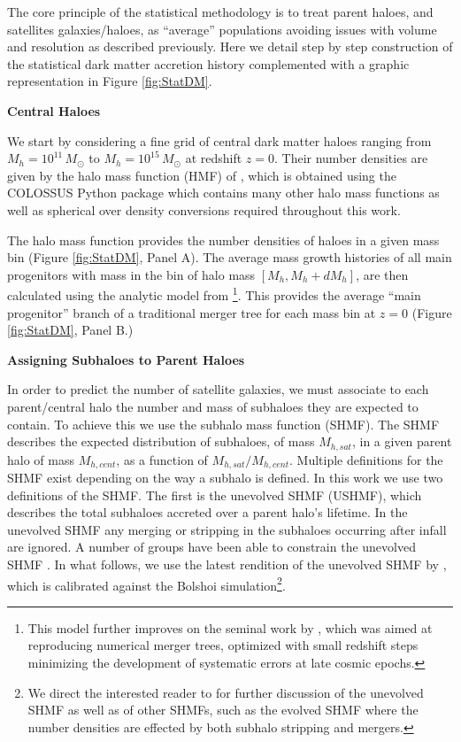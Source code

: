 The core principle of the statistical methodology is to treat parent haloes, and satellites galaxies/haloes, as ``average'' populations avoiding issues with volume and resolution as described previously. Here  we detail step by step construction of the statistical dark matter accretion history complemented with a graphic representation in Figure \ref{fig:StatDM}.

\textbf{Central Haloes}

We start by considering a fine grid of central dark matter haloes ranging from $M_{h}=10^{11}\, M_{\odot}$ to $M_{h}=10^{15}\, M_{\odot}$ at redshift $z=0$. Their number densities are given by the halo mass function (HMF) of \citet{Despali2016TheDefinitions}, which is obtained using the COLOSSUS Python package \citep{Diemer2017COLOSSUS:Halos} which contains many other halo mass functions as well as spherical over density conversions required throughout this work. 

The halo mass function provides the number densities of haloes in a given mass bin (Figure \ref{fig:StatDM}, Panel A).
The average mass growth histories of all main progenitors with mass in the bin of halo mass $[M_{h},M_{h}+dM_{h}]$, are then calculated using the analytic model from \cite{vandenBosch2014ComingWells}\footnote{This model further improves on the seminal work by \citet{Parkinson2008GeneratingTrees}, which was aimed at reproducing numerical merger trees, optimized with small redshift steps minimizing the development of systematic errors at late cosmic epochs.}. This provides the average ``main progenitor'' branch of a traditional merger tree for each mass bin at $z = 0$ (Figure \ref{fig:StatDM}, Panel B.)

\textbf{Assigning Subhaloes to Parent Haloes}

In order to predict the number of satellite galaxies, we must associate to each parent/central halo the number and mass of subhaloes they are expected to contain. To achieve this we use the subhalo mass function (SHMF). The SHMF describes the expected distribution of subhaloes, of mass $M_{h,sat}$, in a given parent halo of mass $M_{h,cent}$, as a function of $M_{h,sat}/M_{h,cent}$. Multiple definitions for the SHMF exist depending on the way a subhalo is defined. In this work we use two definitions of the SHMF. The first is the unevolved SHMF (USHMF), which describes the total subhaloes accreted over a parent halo's lifetime. In the unevolved SHMF any merging or stripping in the subhaloes occurring after infall are ignored. A number of groups have been able to constrain the unevolved SHMF \citep{Giocoli2008AnalyticalHaloes,Jiang2016StatisticsFunctions}. In what follows, we use the latest rendition of the unevolved SHMF by \citet{Jiang2016StatisticsFunctions}, which is calibrated against the Bolshoi simulation\footnote{ We direct the interested reader to \citet{Jiang2016StatisticsFunctions} for further discussion of the unevolved SHMF as well as of other SHMFs, such as the evolved SHMF where the number densities are effected by both subhalo stripping and mergers.}.

